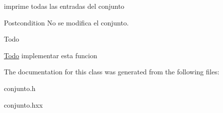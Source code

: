 imprime todas las entradas del conjunto 

\begin{DoxyPostcond}{Postcondition}
No se modifica el conjunto. 
\end{DoxyPostcond}
\begin{DoxyRefDesc}{Todo}
\item[\hyperlink{todo__todo000001}{Todo}]implementar esta funcion \end{DoxyRefDesc}


The documentation for this class was generated from the following files\-:\begin{DoxyCompactItemize}
\item 
conjunto.\-h\item 
conjunto.\-hxx\end{DoxyCompactItemize}
